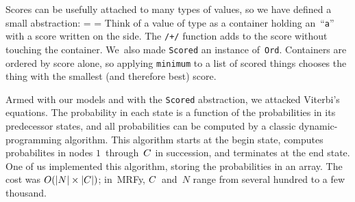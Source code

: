 \documentclass[preprint,nonatbib,blockstyle,times]{sigplanconf}
\newcommand\alignwidth{\ensuremath C} %
\newcommand\seclabel[1]{\label{sec:#1}}
\newif\ifverbatimsmall
\newcommand\smallverbatiminput[1]{%
  \verbatimsmalltrue
  \presvtopsep=\topsep
  \topsep=0.78\topsep
  \verbatimsmallfalse
  \topsep=\presvtopsep
}
\newcommand\smallfuzzverbatiminput[2]{%
  \hfuzz=#1 \smallverbatiminput{#2}\hfuzz=0pt }
\begin{document}

Scores can be usefully attached to many types of values,
so we have defined a small abstraction:
\smallfuzzverbatiminput{10.8pt}{vscore}
Think of a value of type  as a container holding
 an~``\texttt a'' with a score written on the side.
The \texttt{/+/} function adds to the score without touching the
 container.
%
We~also made \texttt{Scored} an instance of~\texttt{Ord}.
Containers are ordered by score alone, so applying
\texttt{minimum} to a list of scored things chooses the thing with the
smallest (and therefore best) score.


Armed with our models and with the \texttt{Scored} abstraction, we
attacked Viterbi's equations. 
The probability in each state is a function of the probabilities
in its predecessor states, 
and all probabilities can be computed by a classic dynamic-programming
algorithm.
This algorithm starts at the {begin} state,
computes probabilites in nodes $1$~through~$\alignwidth$ in
succession, and terminates at the {end} state.
One of us implemented this algorithm, storing the probabilities in an array.
The cost was
$O(|N|\times|\alignwidth|)$;
in~MRFy, $\alignwidth$~and~$N$ range from several hundred to a few
thousand.





\seclabel{cons}
\seclabel{vee-prime}
\end{document}
